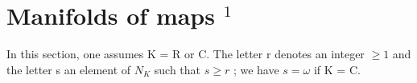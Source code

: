 \section{\texorpdfstring{Manifolds of maps \(^{1}\)}{Manifolds of maps ¹}}

In this section, one assumes K = R or C. The letter r denotes an integer \(\geqslant 1\) and the letter s an element of \(N_{K}\) such that \(s \geqslant r\) ; we have \(s = \omega\) if K = C.

